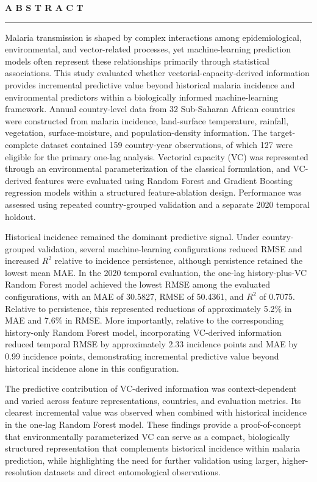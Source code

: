 \documentclass[10pt,twocolumn]{article}
\begin{document}
\begin{minipage}{0.70\textwidth}
\vspace{0pt}
\footnotesize

\textbf{A B S T R A C T}

\vspace{0.25em}
\hrule
\vspace{0.45em}

Malaria transmission is shaped by complex interactions among
epidemiological, environmental, and vector-related processes, yet
machine-learning prediction models often represent these relationships
primarily through statistical associations. This study evaluated
whether vectorial-capacity-derived information provides incremental
predictive value beyond historical malaria incidence and environmental
predictors within a biologically informed machine-learning framework.
Annual country-level data from 32 Sub-Saharan African countries were
constructed from malaria incidence, land-surface temperature, rainfall,
vegetation, surface-moisture, and population-density information. The
target-complete dataset contained 159 country-year observations, of
which 127 were eligible for the primary one-lag analysis. Vectorial
capacity (VC) was represented through an environmental parameterization
of the classical formulation, and VC-derived features were evaluated
using Random Forest and Gradient Boosting regression models within a
structured feature-ablation design. Performance was assessed using
repeated country-grouped validation and a separate 2020 temporal
holdout.

Historical incidence remained the dominant predictive signal. Under
country-grouped validation, several machine-learning configurations
reduced RMSE and increased \(R^2\) relative to incidence persistence,
although persistence retained the lowest mean MAE. In the 2020
temporal evaluation, the one-lag history-plus-VC Random Forest model
achieved the lowest RMSE among the evaluated configurations, with an
MAE of 30.5827, RMSE of 50.4361, and \(R^2\) of 0.7075. Relative to
persistence, this represented reductions of approximately 5.2\% in
MAE and 7.6\% in RMSE. More importantly, relative to the corresponding
history-only Random Forest model, incorporating VC-derived information
reduced temporal RMSE by approximately 2.33 incidence points and MAE
by 0.99 incidence points, demonstrating incremental predictive value
beyond historical incidence alone in this configuration.

The predictive contribution of VC-derived information was
context-dependent and varied across feature representations,
countries, and evaluation metrics. Its clearest incremental value was
observed when combined with historical incidence in the one-lag Random
Forest model. These findings provide a proof-of-concept that
environmentally parameterized VC can serve as a compact, biologically
structured representation that complements historical incidence within
malaria prediction, while highlighting the need for further validation
using larger, higher-resolution datasets and direct entomological
observations.

\end{minipage}
\end{document}
